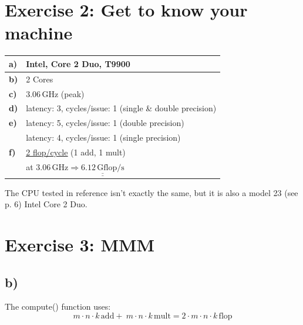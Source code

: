 \documentclass[11pt]{article}
\newcommand{\unit}[1]{\ensuremath{\, \mathrm{#1}}}			%
\begin{document}
	\section*{Exercise 2: Get to know your machine}
	\renewcommand{\arraystretch}{1.5}
	\begin{tabular}[H]{|l|l|}
	\hline
	\textbf{a)\footnotemark[1]} & Intel, Core 2 Duo, T9900 \\\hline
	\textbf{b)\footnotemark[1]} & 2 Cores \\\hline
	\textbf{c)\footnotemark[1]} & $3.06 \unit{GHz}$ (peak) \\\hline
	\textbf{d)\footnotemark[2]} & latency: 3, cycles/issue: 1 (single \& double precision) \\\hline
	\textbf{e)\footnotemark[2]} & latency: 5, cycles/issue: 1 (double precision) \\
	& latency: 4, cycles/issue: 1 (single precision)\\\hline
	\textbf{f)} & \underline{\underline{2 flop/cycle}} (1 add, 1 mult) \\
	& at $3.06 \unit{GHz} \Rightarrow \underline{\underline{6.12 \unit{Gflop/s}}}$\\\hline
	\end{tabular}
	\newline\newline\newline
	The CPU tested in reference \footnotemark[2] isn't exactly the same, but it is also a model 23 (see p. 6) Intel Core 2 Duo.
	
	\newpage
	\section*{Exercise 3: MMM}
	\subsection*{b)}
		The compute() function uses:
		\[ m \cdot n \cdot k \unit{add} + ~ m \cdot n \cdot k \unit{mult} = 2 \cdot m \cdot n \cdot k \unit{flop}  \]
\end{document}
